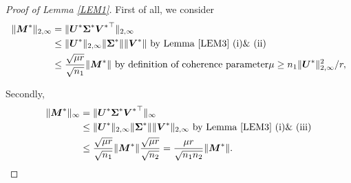 \documentclass[12pt]{article}
\theoremstyle{remark}
\newcommand{\bs}[1]{{\boldsymbol{#1}^*}}
\begin{document}
\begin{proof}[Proof of Lemma \ref{LEM1}]
First of all, we consider 
\begin{align*}
\|\bs M\|_{2, \infty} 
& = 
\|\bs U\bs \Sigma \bs V^\top\|_{2,\infty} \\
& \leq \|\bs U\|_{2, \infty} \|\bs\Sigma\| \|\bs V\| \text{ by Lemma \ref{LEM3} (i)\& (ii)} \\
& \leq \frac{\sqrt{\mu r}}{\sqrt{n_1}}  \|\bs M\|  \text{ by definition of coherence parameter} \mu \geq {n_1 \|\bs U\|_{2,\infty}^2}/{r},
\end{align*}


Secondly, 
\begin{align*}
\|\bs M\|_{\infty} 
& = 
\|\bs U\bs \Sigma \bs V^\top\|_{\infty} \\
& \leq \|\bs U\|_{2, \infty} \|\bs\Sigma\| \|\bs V\|_{2,\infty} \text{ by Lemma \ref{LEM3} (i)\& (iii)}\\
& \leq \frac{\sqrt{\mu r}}{\sqrt{n_1}}  \|\bs M\| \frac{\sqrt{\mu r}}{\sqrt{n_2}}
 = \frac{{\mu r}}{\sqrt{n_1 n_2}}  \|\bs M\| .
\end{align*}
\end{proof}
\end{document}
